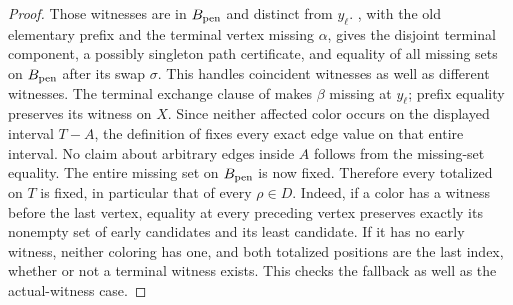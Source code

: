 \begin{proof}
Those witnesses are in $B_{\rm pen}$ and distinct from $y_\ell$.
, with the old elementary
prefix and the terminal vertex missing $\alpha$, gives the disjoint
terminal component, a possibly singleton path certificate, and equality
of all missing sets on $B_{\rm pen}$ after its swap $\sigma$.
This handles coincident witnesses as well as different witnesses.
The terminal exchange clause of
 makes $\beta$ missing
at $y_\ell$; prefix equality preserves its witness on $X$.
Since neither affected color occurs on the displayed interval $T-A$,
the definition of  fixes every exact
edge value on that entire interval. No claim about arbitrary edges
inside $A$ follows from the missing-set equality.
The entire missing set on $B_{\rm pen}$ is now fixed. Therefore every
totalized  on $T$ is fixed,
in particular that of every $\rho\in D$. Indeed, if a color has a
witness before the last vertex, equality at every preceding vertex
preserves exactly its nonempty set of early candidates and its least
candidate. If it has no early witness, neither coloring has one,
and both totalized positions are the last index, whether or not a
terminal witness exists. This checks the fallback as well as the
actual-witness case.


\end{proof}
